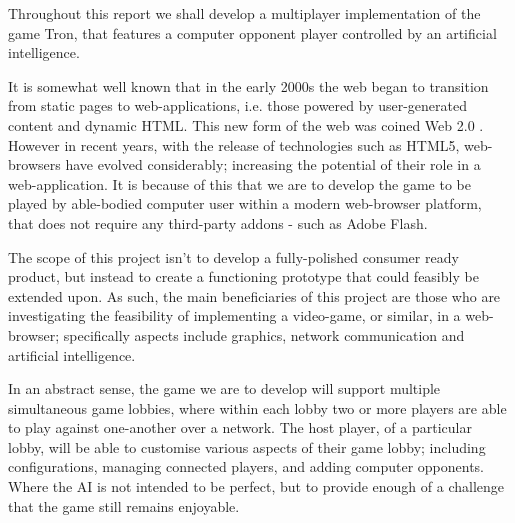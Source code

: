 \documentclass{standalone}
\begin{document}
	Throughout this report we shall develop a multiplayer implementation of the game Tron, that features a computer opponent player controlled by an artificial intelligence.

	It is somewhat well known that in the early 2000s the web began to transition from static pages to web-applications, i.e. those powered by user-generated content and dynamic HTML. This new form of the web was coined Web 2.0 \parencite{Web20}. However in recent years, with the release of technologies such as HTML5, web-browsers have evolved considerably; increasing the potential of their role in a web-application. It is because of this that we are to develop the game to be played by able-bodied computer user within a modern web-browser platform, that does not require any third-party addons - such as Adobe Flash.

	The scope of this project isn't to develop a fully-polished consumer ready product, but instead to create a functioning prototype that could feasibly be extended upon. As such, the main beneficiaries of this project are those who are investigating the feasibility of implementing a video-game, or similar, in a web-browser; specifically aspects include graphics, network communication and artificial intelligence.

	In an abstract sense, the game we are to develop will support multiple simultaneous game lobbies, where within each lobby two or more players are able to play against one-another over a network. The host player, of a particular lobby, will be able to customise various aspects of their game lobby; including configurations, managing connected players, and adding computer opponents. Where the AI is not intended to be perfect, but to provide enough of a challenge that the game still remains enjoyable.
\end{document}
